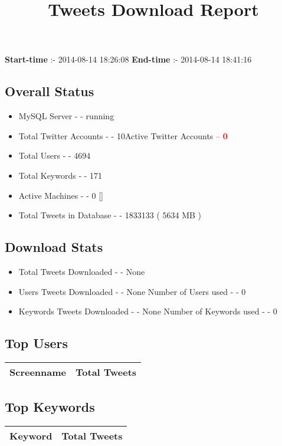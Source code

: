 \documentclass{article}\usepackage[T1]{fontenc}
\begin{document}
\title{\textbf{Tweets Download Report}}
               \date{}
                \maketitle
               \centerline{\textbf{Start-time} :- 2014-08-14 18:26:08 \hspace{40pt} \textbf{End-time} :- 2014-08-14 18:41:16}               \subsection*{Overall Status}                \begin{itemize}                \item MySQL Server - - running               \item Total Twitter Accounts - - 10\newline Active Twitter Accounts -- \textcolor{red}{\textbf{0}}               \item Total Users - - 4694               \item Total Keywords - - 171               \item Active Machines - - 0 []               \item Total Tweets in Database - - 1833133 ( 5634 MB )               \end{itemize}               \subsection*{Download Stats}                \begin{itemize}                \item Total Tweets Downloaded - - None               \item Users Tweets Downloaded - - None \newline Number of Users used - - 0               \item Keywords Tweets Downloaded - - None \newline Number of Keywords used - - 0              \end{itemize}              \subsection*{Top Users}\begin{tabular}{|c|c|}         \hline         Screenname & Total Tweets \\ 
 \hline
\end{tabular}\subsection*{Top Keywords}\begin{tabular}{|c|c|}         \hline         Keyword & Total Tweets \\ 
 \hline
\end{tabular}
\end{document}
